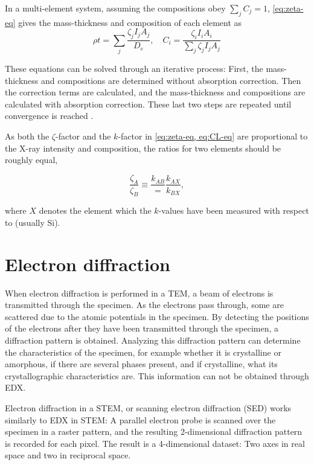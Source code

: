 In a multi-element system, assuming the compositions obey $\sum_{j} C_j = 1$, \cref{eq:zeta-eq} gives the mass-thickness and composition of each element as
\begin{equation}
\rho t = \sum_j \frac{\zeta_j I_j A_j}{D_e}, \quad C_i = \frac{\zeta_i I_i A_i}{\sum_j \zeta_j I_j A_j}
\end{equation}

These equations can be solved through an iterative process: First, the mass-thickness and compositions are determined without absorption correction. Then the correction terms are calculated, and the mass-thickness and compositions are calculated with absorption correction. These last two steps are repeated until convergence is reached \cite{zeta-method}.

As both the $\zeta$-factor and the $k$-factor in \cref{eq:zeta-eq, eq:CL-eq} are proportional to the X-ray intensity and composition, the ratios for two elements should be roughly equal,

\begin{equation}
\label{compare_zeta_CL}
\frac{\zeta_A}{\zeta_B} \equiv \frac{k_{AB}} = \frac{k_{AX}}{k_{BX}},
\end{equation}

where $X$ denotes the element which the $k$-values have been measured with respect to (usually Si).

\section{Electron diffraction}\label{ED}
When electron diffraction is performed in a TEM, a beam of electrons is transmitted through the specimen. As the electrons pass through, some are scattered due to the atomic potentials in the specimen. By detecting the positions of the electrons after they have been transmitted through the specimen, a diffraction pattern is obtained. Analyzing this diffraction pattern can determine the characteristics of the specimen, for example whether it is crystalline or amorphous, if there are several phases present, and if crystalline, what its crystallographic characteristics are. This information can not be obtained through EDX.

Electron diffraction in a STEM, or scanning electron diffraction (SED) works similarly to EDX in STEM: A parallel electron probe is scanned over the specimen in a raster pattern, and the resulting 2-dimensional diffraction pattern is recorded for each pixel. The result is a 4-dimensional dataset: Two axes in real space and two in reciprocal space.

